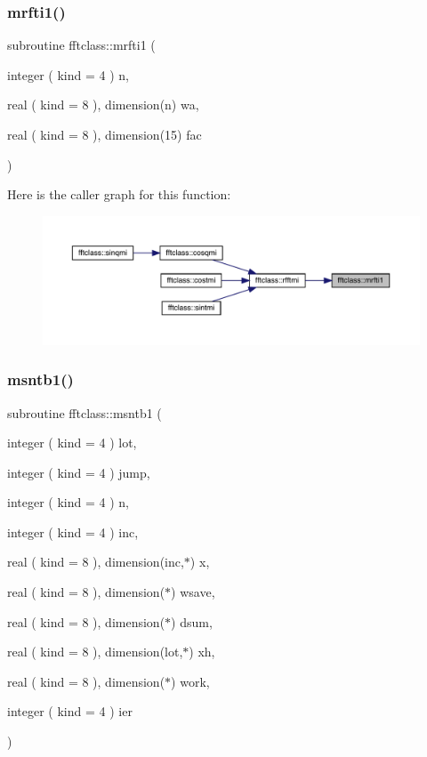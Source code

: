 \subsubsection{\texorpdfstring{mrfti1()}{mrfti1()}}
{\footnotesize\ttfamily subroutine fftclass\+::mrfti1 (\begin{DoxyParamCaption}\item[{integer ( kind = 4 )}]{n,  }\item[{real ( kind = 8 ), dimension(n)}]{wa,  }\item[{real ( kind = 8 ), dimension(15)}]{fac }\end{DoxyParamCaption})}

Here is the caller graph for this function\+:\nopagebreak
\begin{figure}[H]
\begin{center}
\leavevmode
\includegraphics[width=350pt]{namespacefftclass_a88a3f7fd420d15d4e4d603d4d8ebf38e_icgraph}
\end{center}
\end{figure}
\mbox{\label{namespacefftclass_aebd25014fd97baa3be31bda9b446e99f}} 
\subsubsection{\texorpdfstring{msntb1()}{msntb1()}}
{\footnotesize\ttfamily subroutine fftclass\+::msntb1 (\begin{DoxyParamCaption}\item[{integer ( kind = 4 )}]{lot,  }\item[{integer ( kind = 4 )}]{jump,  }\item[{integer ( kind = 4 )}]{n,  }\item[{integer ( kind = 4 )}]{inc,  }\item[{real ( kind = 8 ), dimension(inc,$\ast$)}]{x,  }\item[{real ( kind = 8 ), dimension($\ast$)}]{wsave,  }\item[{real ( kind = 8 ), dimension($\ast$)}]{dsum,  }\item[{real ( kind = 8 ), dimension(lot,$\ast$)}]{xh,  }\item[{real ( kind = 8 ), dimension($\ast$)}]{work,  }\item[{integer ( kind = 4 )}]{ier }\end{DoxyParamCaption})}

